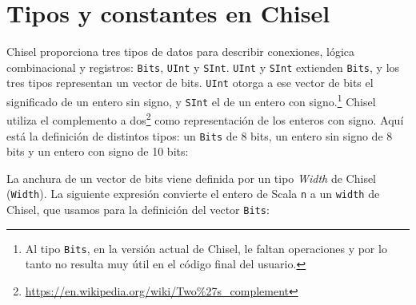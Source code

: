 \documentclass[%
    10pt,
    headinclude, footinclude=false,
    openright, %
    notitlepage,
    cleardoublepage=empty,
    headsepline,
    numbers=noenddot,
    bibliography=totoc, index=totoc,
    ]{scrbook}
\newcommand{\code}[1]{{\lstinline[basicstyle=\small\ttfamily]{#1}}}
\newcommand{\codefoot}[1]{{\lstinline[basicstyle=\footnotesize\ttfamily]{#1}}}
\newcommand{\myref}[2]{\href{#1}{#2}}
\renewcommand{\myref}[2]{{#2}{\footnote{\url{#1}}}}
\begin{document}
\section{Tipos y constantes en Chisel}


Chisel proporciona tres tipos de datos para describir conexiones, lógica combinacional y registros:
\code{Bits}, \code{UInt} y \code{SInt}. \code{UInt} y \code{SInt} extienden \code{Bits},
y los tres tipos representan un vector de bits. \code{UInt} otorga a ese vector de
bits el significado de un entero sin signo, y \code{SInt} el de un entero
con signo.\footnote{Al tipo \codefoot{Bits}, en la versión actual de Chisel, le faltan operaciones y
por lo tanto no resulta muy útil en el código final del usuario.}
Chisel utiliza el \myref{https://en.wikipedia.org/wiki/Two\%27s\_complement}{complemento a dos}
como representación de los enteros con signo.
Aquí está la definición de distintos tipos: un \code{Bits} de 8 bits, un entero sin signo de 8 bits y un entero
con signo de 10 bits:




\noindent La anchura de un vector de bits viene definida por un tipo \emph{Width} de Chisel (\code{Width}).
La siguiente expresión convierte el entero de Scala \code{n} a un \code{width} de Chisel,
que usamos para la definición del vector \code{Bits}:

\end{document}
